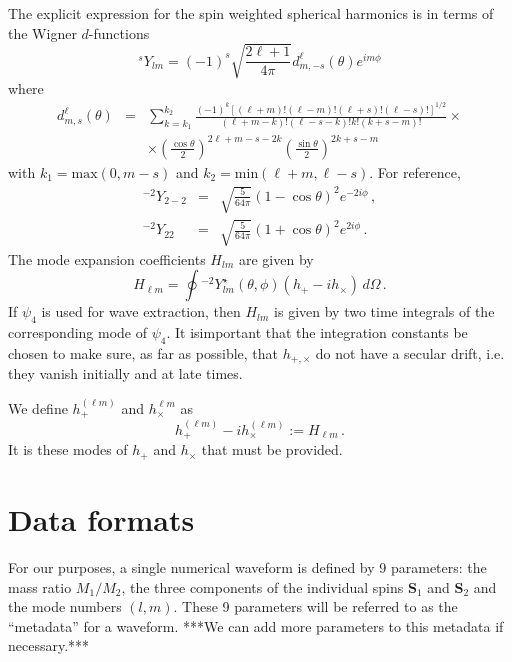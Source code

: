 \documentclass[amsmath,amssymb]{article}
\begin{document}
The explicit expression for the spin weighted spherical harmonics is
in terms of the Wigner $d$-functions
\begin{equation}
  \label{eq:5}
   {}^sY_{lm} = (-1)^s\sqrt{\frac{2\ell+1}{4\pi}} d^\ell_{m,-s}(\theta)e^{im\phi}
\end{equation}
where
\begin{eqnarray}
  \label{eq:6}
  d^\ell_{m,s}(\theta) &=& \sum_{k = k_1}^{k_2}
    \frac{(-1)^k[(\ell+m)!(\ell-m)!(\ell+s)!(\ell-s)!]^{1/2}}{(\ell +m
      -k)!(\ell-s-k)!k!(k+s-m)!} \times \\ 
    &&\times \left(\frac{\cos\theta}{2}\right)^{2\ell+m-s-2k}\left(\frac{\sin\theta}{2}\right)^{2k+s-m}  
\end{eqnarray}
with $k_1 = \textrm{max}(0, m-s)$ and $k_2=\textrm{min}(\ell+m,
\ell-s)$.  For reference,
\begin{eqnarray}
  \label{eq:7}
  {}^{-2}Y_{2-2} &=& \sqrt{\frac{5}{64\pi}}(1-\cos\theta)^2e^{-2i\phi}\,, \\
  {}^{-2}Y_{22} &=& \sqrt{\frac{5}{64\pi}}(1+\cos\theta)^2e^{2i\phi} \,.
\end{eqnarray}
The mode expansion coefficients $H_{lm}$ are given by
\begin{equation}
  \label{eq:10}
  H_{\ell m} = \oint {}^{-2}Y_{lm}^\star(\theta,\phi)(h_+-ih_\times )\,d\Omega\,.
\end{equation}
If $\psi_4$ is used for wave extraction, then $H_{lm}$ is given by two
time integrals of the corresponding mode of $\psi_4$.  It isimportant
that the integration constants be chosen to make sure, as far as
possible, that $h_{+,\times}$ do not have a secular drift, i.e. they
vanish initially and at late times.  

We define $h_+^{(\ell m)}$ and $h_\times^{\ell m}$ as
\begin{equation}
  \label{eq:11}
  h_+^{(\ell m)} -ih_\times^{(\ell m)} := H_{\ell m}\,.  
\end{equation}
It is these modes of $h_+$ and $h_\times$ that must be provided.  






\section{Data formats}
\label{sec:format}


For our purposes, a single numerical waveform is defined by 9
parameters: the mass ratio $M_1/M_2$, the three components of the
individual spins $\mathbf{S}_1$ and $\mathbf{S}_2$ and the mode
numbers $(l,m)$.  These 9 parameters will be referred to as the
``metadata'' for a waveform.  ***We can add more parameters to this
metadata if necessary.***
\end{document}
